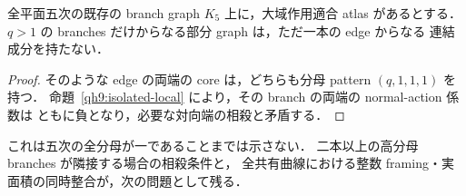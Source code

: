 \begin{corollary}\label{qh9:isolated-edge}
全平面五次の既存の branch graph $K_5$ 上に，大域作用適合 atlas があるとする．
$q>1$ の branches だけからなる部分 graph は，ただ一本の edge からなる
連結成分を持たない．
\end{corollary}

\begin{proof}
そのような edge の両端の core は，どちらも分母 pattern $(q,1,1,1)$ を持つ．
命題~\ref{qh9:isolated-local} により，その branch の両端の normal-action 係数は
ともに負となり，必要な対向端の相殺と矛盾する．
\end{proof}

これは五次の全分母が一であることまでは示さない．
二本以上の高分母 branches が隣接する場合の相殺条件と，
全共有曲線における整数 framing・実面積の同時整合が，次の問題として残る．
